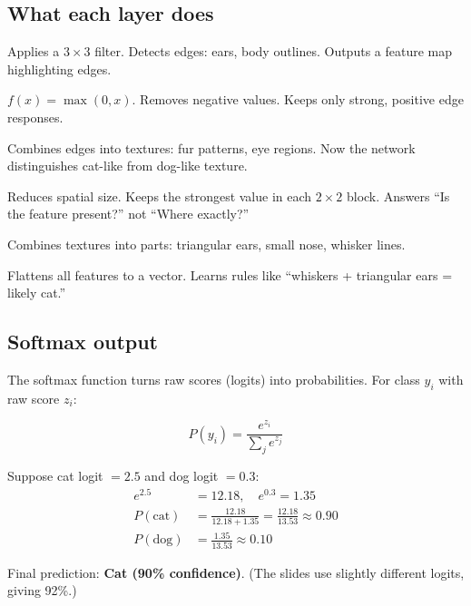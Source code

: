 \documentclass[a4paper,11pt]{article}
\begin{document}
\subsection{What each layer does}

\begin{description}[leftmargin=7em,style=nextline,font=\normalfont\bfseries\color{navy}]
  \item[Conv $3\times3$] Applies a $3\times3$ filter.
    Detects edges: ears, body outlines.
    Outputs a feature map highlighting edges.
  \item[ReLU] $f(x) = \max(0, x)$.
    Removes negative values.
    Keeps only strong, positive edge responses.
  \item[Conv $5\times5$] Combines edges into textures: fur patterns,
    eye regions.
    Now the network distinguishes cat-like from dog-like texture.
  \item[Max Pool $2\times2$] Reduces spatial size.
    Keeps the strongest value in each $2\times2$ block.
    Answers ``Is the feature present?'' not ``Where exactly?''
  \item[Dense] Combines textures into parts: triangular ears, small
    nose, whisker lines.
  \item[Flatten + Dense] Flattens all features to a vector.
    Learns rules like ``whiskers + triangular ears = likely cat.''
\end{description}

\subsection{Softmax output}

The softmax function turns raw scores (logits) into probabilities.
For class $y_i$ with raw score $z_i$:

\begin{equation}
  P(y_i) = \frac{e^{z_i}}{\displaystyle\sum_j e^{z_j}}
\end{equation}

\noindent Suppose cat logit $= 2.5$ and dog logit $= 0.3$:
\begin{align}
  e^{2.5} &= 12.18, \quad e^{0.3} = 1.35 \\
  P(\text{cat}) &= \frac{12.18}{12.18 + 1.35} = \frac{12.18}{13.53} \approx 0.90 \\
  P(\text{dog}) &= \frac{1.35}{13.53} \approx 0.10
\end{align}

Final prediction: \textbf{Cat (90\% confidence)}.
(The slides use slightly different logits, giving 92\%.)
\end{document}
